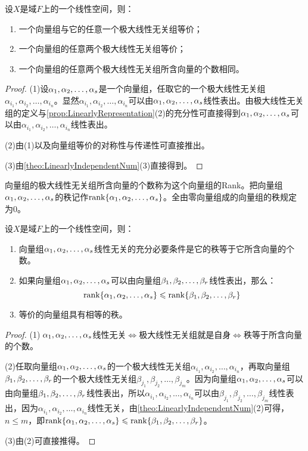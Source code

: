 \begin{property}\label{prop:MaximalLinearlyIndependentSystem}
	设$X$是域$F$上的一个线性空间，则：
	\begin{enumerate}
		\item 一个向量组与它的任意一个极大线性无关组等价；
		\item 一个向量组的任意两个极大线性无关组等价；
		\item 一个向量组的任意两个极大线性无关组所含向量的个数相同。
	\end{enumerate}
\end{property}
\begin{proof}
	(1)设$\alpha_1, \alpha_2, \dots, \alpha_{s}$是一个向量组，任取它的一个极大线性无关组$\alpha_{i_1},\alpha_{i_2},\dots,\alpha_{i_n}$。显然$\alpha_{i_1},\alpha_{i_2},\dots,\alpha_{i_n}$可以由$\alpha_1, \alpha_2, \dots, \alpha_{s}$线性表出。由极大线性无关组的定义与\cref{prop:LinearlyRepresentation}(2)的充分性可直接得到$\alpha_1, \alpha_2, \dots, \alpha_{s}$可以由$\alpha_{i_1},\alpha_{i_2},\dots,\alpha_{i_n}$线性表出。\par
	(2)由(1)以及向量组等价的对称性与传递性可直接推出。\par
	(3)由\cref{theo:LinearlyIndependentNum}(3)直接得到。
\end{proof}
\begin{definition}
	向量组的极大线性无关组所含向量的个数称为这个向量组的\gls{Rank}。把向量组$\alpha_1, \alpha_2, \dots, \alpha_{s}$的秩记作$\operatorname{rank}\{\alpha_1, \alpha_2, \dots, \alpha_{s}\}$。全由零向量组成的向量组的秩规定为$0$。
\end{definition}
\begin{property}\label{prop:Rank}
	设$X$是域$F$上的一个线性空间，则：
	\begin{enumerate}
		\item 向量组$\alpha_1, \alpha_2, \dots, \alpha_{s}$线性无关的充分必要条件是它的秩等于它所含向量的个数。
		\item 如果向量组$\alpha_1, \alpha_2, \dots, \alpha_{s}$可以由向量组$\beta_1, \beta_2, \dots, \beta_{r}$线性表出，那么：
		\begin{equation*}
			\operatorname{rank}\{\alpha_1, \alpha_2, \dots, \alpha_{s}\}\leqslant\operatorname{rank}\{\beta_1, \beta_2, \dots, \beta_{r}\}
		\end{equation*}
		\item 等价的向量组具有相等的秩。
	\end{enumerate}
\end{property}
\begin{proof}
	(1)$\;\alpha_1, \alpha_2, \dots, \alpha_{s}$线性无关$\iff$极大线性无关组就是自身$\iff$秩等于所含向量的个数。\par
	(2)任取向量组$\alpha_1, \alpha_2, \dots, \alpha_{s}$的一个极大线性无关组$\alpha_{i_1},\alpha_{i_2},\dots,\alpha_{i_n}$，再取向量组$\beta_1, \beta_2, \dots, \beta_{r}$的一个极大线性无关组$\beta_{j_1},\beta_{j_2},\dots,\beta_{j_m}$。因为向量组$\alpha_1, \alpha_2, \dots, \alpha_{s}$可以由向量组$\beta_1, \beta_2, \dots, \beta_{r}$线性表出，所以$\alpha_{i_1},\alpha_{i_2},\dots,\alpha_{i_n}$可以由$\beta_{j_1},\beta_{j_2},\dots,\beta_{j_m}$线性表出，因为$\alpha_{i_1},\alpha_{i_2},\dots,\alpha_{i_n}$线性无关，由\cref{theo:LinearlyIndependentNum}(2)可得，$n\leqslant m$，即$\operatorname{rank}\{\alpha_1, \alpha_2, \dots, \alpha_{s}\}\leqslant\operatorname{rank}\{\beta_1, \beta_2, \dots, \beta_{r}\}$。\par
	(3)由(2)可直接推得。
\end{proof}
